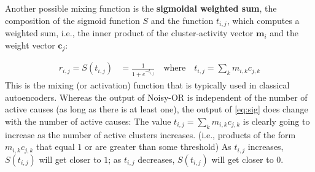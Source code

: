 Another possible mixing function is the \textbf{sigmoidal weighted sum}, 
the composition of the sigmoid function $S$ and the function $t_{i,j}$, 
which computes a weighted sum, i.e., the inner product of the cluster-activity 
vector $\mathbf{m}_i$ and the weight vector $\mathbf{c}_j$:

	\begin{align} %
	\label{eq:sig}
	r_{i,j} = S(t_{i,j}) &= \frac{1}{1 + e^{-t_{i,j}}} \quad %
	\text{where} \quad t_{i,j} = \sum_k m_{i,k} c_{j,k}
	\end{align}
This is the mixing (or activation) function that is typically used in classical autoencoders. 
Whereas the output of Noisy-OR is independent of the number of active 
causes (as long as there is at least one), the output of \eqref{eq:sig} does
change with the number of active causes: The value $t_{i,j} = \sum_k m_{i,k} c_{j,k}$ 
is clearly going to increase as the number of active clusters increases.
(i.e., products of the form $m_{i,k} c_{j,k}$ that equal $1$ or are greater than some threshold) 
As $t_{i,j}$ increases, $S(t_{i,j})$ will get closer to $1$; as %
$t_{i,j}$ decreases, $S(t_{i,j})$ will get closer to $0$.

